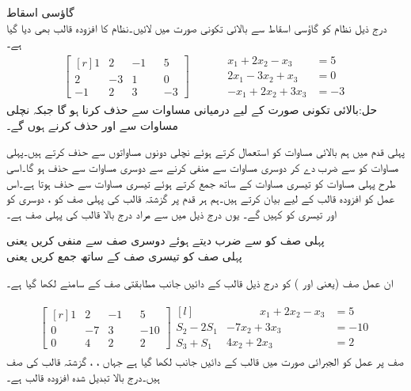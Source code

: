 \quad گاؤسی اسقاط\\
درج ذیل نظام کو گاؤسی اسقاط سے بالائی تکونی صورت میں لائیں۔نظام کا افزودہ قالب بھی دیا گیا ہے۔
\begin{gather*}
\begin{bmatrix*}[r]
1&2&-1&&5\\
2&-3&1&&0\\
-1&2&3&&-3
\end{bmatrix*}\quad \quad \quad
\begin{aligned}
x_1+2x_2-x_3&=5\\
2x_1-3x_2+x_3&=0\\
-x_1+2x_2+3x_3&=-3
\end{aligned}
\end{gather*}
حل:بالائی تکونی صورت کے لیے درمیانی مساوات سے  حذف کرنا ہو گا جبکہ نچلی مساوات سے  اور  حذف کرنے ہوں گے۔

پہلی قدم میں ہم بالائی مساوات  کو استعمال کرتے ہوئے نچلی دونوں مساواتوں سے  حذف کرتے ہیں۔پہلی مساوات کو  سے ضرب دے کر دوسری مساوات سے منفی کرنے سے دوسری مساوات سے  حذف ہو گا۔اسی طرح پہلی مساوات کو تیسری مساوات کے ساتھ جمع کرتے ہوئے تیسری مساوات سے  حذف ہوتا ہے۔اس عمل کو افزودہ قالب کے لیے بیان کرتے ہیں۔ہم ہر قدم پر گزشتہ قالب کی پہلی صف کو ، دوسری کو  اور تیسری کو  کہیں گے۔ یوں درج ذیل میں  سے مراد درج بالا قالب کی پہلی صف  ہے۔

 پہلی صف کو  سے ضرب دیتے ہوئے دوسری صف سے منفی کریں یعنی \\
پہلی صف کو تیسری صف کے ساتھ جمع کریں یعنی 

ان عمل صف (یعنی  اور ) کو درج ذیل قالب کے دائیں جانب مطابقتی صف کے سامنے لکھا گیا ہے۔

\begin{gather*}
\begin{bmatrix*}[r] 1&2&-1&&5\\0&-7&3&&-10\\0&4&2&&2  \end{bmatrix*}\begin{matrix*}[l]  \\ S_2-2S_1\\S_3+S_1\end{matrix*}
\begin{aligned}\quad \quad \quad
x_1+2x_2-x_3&=5\\
-7x_2+3x_3&=-10\\
4x_2+2x_3&=2
\end{aligned}
\end{gather*}
صف پر عمل کو الجبرائی صورت میں قالب کے دائیں جانب لکھا گیا ہے جہاں ، ،   گزشتہ قالب کی  صف ہیں۔درج بالا تبدیل شدہ افزودہ قالب ہے۔

